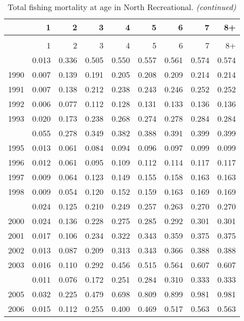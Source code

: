 \documentclass[
]{article}
\begin{document}
\begin{longtable}[t]{lrrrrrrrr}
\caption{\label{tab:North_Recreational-fleet-FAA-table}Total fishing mortality at age in North Recreational.}\\
\toprule
  & 1 & 2 & 3 & 4 & 5 & 6 & 7 & 8+\\
\midrule
\endfirsthead
\caption[]{Total fishing mortality at age in North Recreational. \textit{(continued)}}\\
\toprule
  & 1 & 2 & 3 & 4 & 5 & 6 & 7 & 8+\\
\midrule
\endhead

\endfoot
\bottomrule
\endlastfoot
1989 & 0.013 & 0.336 & 0.505 & 0.550 & 0.557 & 0.561 & 0.574 & 0.574\\
1990 & 0.007 & 0.139 & 0.191 & 0.205 & 0.208 & 0.209 & 0.214 & 0.214\\
1991 & 0.007 & 0.138 & 0.212 & 0.238 & 0.243 & 0.246 & 0.252 & 0.252\\
1992 & 0.006 & 0.077 & 0.112 & 0.128 & 0.131 & 0.133 & 0.136 & 0.136\\
1993 & 0.020 & 0.173 & 0.238 & 0.268 & 0.274 & 0.278 & 0.284 & 0.284\\
\addlinespace
1994 & 0.055 & 0.278 & 0.349 & 0.382 & 0.388 & 0.391 & 0.399 & 0.399\\
1995 & 0.013 & 0.061 & 0.084 & 0.094 & 0.096 & 0.097 & 0.099 & 0.099\\
1996 & 0.012 & 0.061 & 0.095 & 0.109 & 0.112 & 0.114 & 0.117 & 0.117\\
1997 & 0.009 & 0.064 & 0.123 & 0.149 & 0.155 & 0.158 & 0.163 & 0.163\\
1998 & 0.009 & 0.054 & 0.120 & 0.152 & 0.159 & 0.163 & 0.169 & 0.169\\
\addlinespace
1999 & 0.024 & 0.125 & 0.210 & 0.249 & 0.257 & 0.263 & 0.270 & 0.270\\
2000 & 0.024 & 0.136 & 0.228 & 0.275 & 0.285 & 0.292 & 0.301 & 0.301\\
2001 & 0.017 & 0.106 & 0.234 & 0.322 & 0.343 & 0.359 & 0.375 & 0.375\\
2002 & 0.013 & 0.087 & 0.209 & 0.313 & 0.343 & 0.366 & 0.388 & 0.388\\
2003 & 0.016 & 0.110 & 0.292 & 0.456 & 0.515 & 0.564 & 0.607 & 0.607\\
\addlinespace
2004 & 0.011 & 0.076 & 0.172 & 0.251 & 0.284 & 0.310 & 0.333 & 0.333\\
2005 & 0.032 & 0.225 & 0.479 & 0.698 & 0.809 & 0.899 & 0.981 & 0.981\\
2006 & 0.015 & 0.112 & 0.255 & 0.400 & 0.469 & 0.517 & 0.563 & 0.563\\

\end{longtable}
\end{document}
